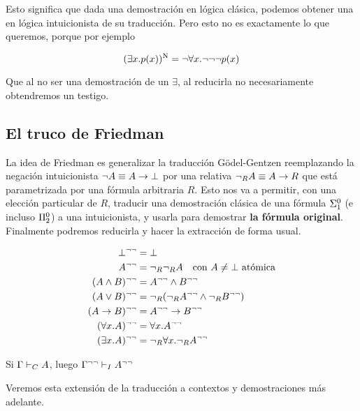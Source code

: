 Esto significa que dada una demostración en lógica clásica, podemos obtener una
en lógica intuicionista de su traducción. Pero esto no es exactamente lo que
queremos, porque por ejemplo

\[
    (\exists x. p(x))^{\text{N}} = \neg \forall x . \neg\neg\neg p(x)
\]

Que al no ser una demostración de un $\exists$, al reducirla no necesariamente
obtendremos un testigo.

\subsection{El truco de Friedman}

La idea de Friedman \cite{miquel-friedman} es generalizar la traducción
Gödel-Gentzen reemplazando la negación intuicionista $\neg A \equiv A
\rightarrow \bot$ por una relativa $\neg_R A \equiv A \rightarrow R$ que
está parametrizada por una fórmula arbitraria $R$. Esto nos va a permitir, con
una elección particular de $R$,
traducir una demostración clásica de una fórmula $\Sigma^0_1$ (e incluso
$\Pi^0_2$) a una intuicionista, y usarla para demostrar \textbf{la fórmula
original}. Finalmente podremos reducirla y hacer la extracción de forma usual.

\begin{definition}
    \begin{align*}
        \bot^{\neg\neg} &= \bot\\
        A^{\neg\neg} &= \neg_R\neg_R A \quad \text{con $A \neq \bot$ atómica}\\
        (A \wedge B)^{\neg\neg} &= A^{\neg\neg} \wedge B^{\neg\neg}\\
        (A \vee B)^{\neg\neg} &= \neg_R(\neg_RA^{\neg\neg} \wedge \neg_RB^{\neg\neg})\\
        (A \rightarrow B)^{\neg\neg} &= A^{\neg\neg} \rightarrow B^{\neg\neg}\\
        (\forall x . A)^{\neg\neg} &= \forall x . A^{\neg\neg}\\
        (\exists x . A)^{\neg\neg} &= \neg_R \forall x . \neg_R A^{\neg\neg}
    \end{align*}
\end{definition}

\begin{theorem}
    Si $\Gamma \vdash_C A$, luego $\Gamma^{\neg\neg} \vdash_I A^{\neg\neg}$

    Veremos esta extensión de la traducción a contextos y demostraciones más adelante.
\end{theorem}

